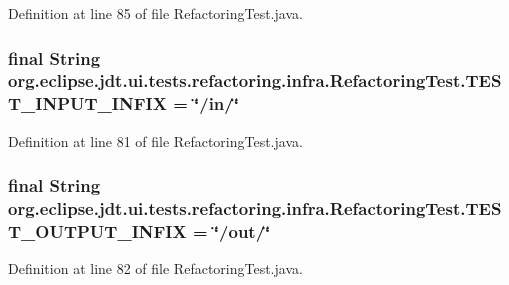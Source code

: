 Definition at line 85 of file RefactoringTest.java.

\hypertarget{classorg_1_1eclipse_1_1jdt_1_1ui_1_1tests_1_1refactoring_1_1infra_1_1RefactoringTest_aa70d88ca205d6286c87e79d4bd70eaab}{
\subsubsection[{TEST\_\-INPUT\_\-INFIX}]{\setlength{\rightskip}{0pt plus 5cm}final String {\bf org.eclipse.jdt.ui.tests.refactoring.infra.RefactoringTest.TEST\_\-INPUT\_\-INFIX} = \char`\"{}/in/\char`\"{}}}
\label{classorg_1_1eclipse_1_1jdt_1_1ui_1_1tests_1_1refactoring_1_1infra_1_1RefactoringTest_aa70d88ca205d6286c87e79d4bd70eaab}


Definition at line 81 of file RefactoringTest.java.

\hypertarget{classorg_1_1eclipse_1_1jdt_1_1ui_1_1tests_1_1refactoring_1_1infra_1_1RefactoringTest_ab3b6c06d50f980b167b4d117915bd1b8}{
\subsubsection[{TEST\_\-OUTPUT\_\-INFIX}]{\setlength{\rightskip}{0pt plus 5cm}final String {\bf org.eclipse.jdt.ui.tests.refactoring.infra.RefactoringTest.TEST\_\-OUTPUT\_\-INFIX} = \char`\"{}/out/\char`\"{}}}
\label{classorg_1_1eclipse_1_1jdt_1_1ui_1_1tests_1_1refactoring_1_1infra_1_1RefactoringTest_ab3b6c06d50f980b167b4d117915bd1b8}


Definition at line 82 of file RefactoringTest.java.

